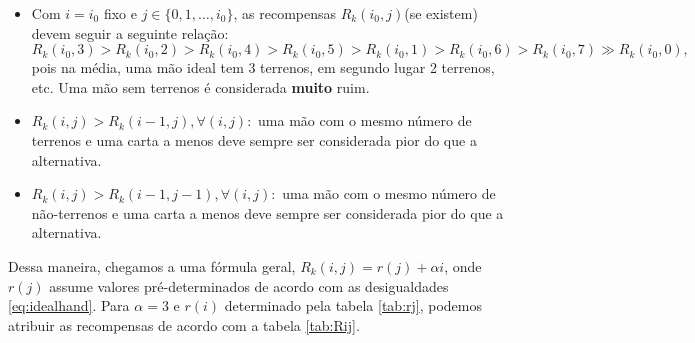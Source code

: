 \documentclass{book}
\begin{document}
\begin{itemize}
  \item Com $i= i_0$ fixo e $j\in\{0,1,\ldots,i_0\}$, as recompensas $R_k(i_0, j)$(se existem) devem seguir a
seguinte relação:
  \begin{equation} \label{eq:idealhand}R_k (i_0, 3) > R_k(i_0, 2) > R_k(i_0, 4)
> R_k(i_0, 5) > R_k(i_0, 1) > R_k(i_0, 6) > R_k(i_0, 7) \gg R_k(i_0,
0),\end{equation}
  pois na média, uma mão ideal tem 3 terrenos, em segundo lugar 2
terrenos, etc. Uma mão sem terrenos é considerada \textbf{muito} ruim.
  \item $R_k(i, j) > R_k(i - 1, j), \forall (i, j):$ uma mão com o mesmo
número de terrenos e uma carta a menos deve sempre ser considerada pior
do que a alternativa.
  \item $R_k(i, j) > R_k(i - 1, j - 1), \forall (i, j):$ uma mão com o mesmo
número de não-terrenos e uma carta a menos deve sempre ser considerada
pior do que a alternativa.
\end{itemize}



Dessa maneira, chegamos a uma fórmula geral, $R_k(i, j) = r(j) + \alpha
i$, onde $r(j)$ assume valores pré-determinados de acordo com
as desigualdades \ref{eq:idealhand}. Para $\alpha = 3$ e $r(i)$ determinado pela tabela
\ref{tab:rj}, podemos atribuir as recompensas de acordo com a tabela
\ref{tab:Rij}.
\end{document}
